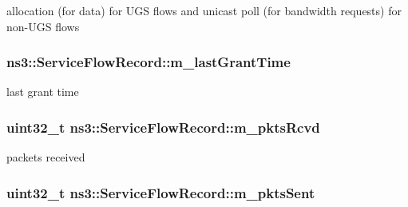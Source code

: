 allocation (for data) for U\+GS flows and unicast poll (for bandwidth requests) for non-\/\+U\+GS flows 

\subsubsection[{\texorpdfstring{m\+\_\+last\+Grant\+Time}{m_lastGrantTime}}]{ ns3\+::\+Service\+Flow\+Record\+::m\+\_\+last\+Grant\+Time\hspace{0.3cm}{\ttfamily [private]}}\hypertarget{classns3_1_1ServiceFlowRecord_a7bb8180a67da3ac452bd11ad634b4d0e}{}\label{classns3_1_1ServiceFlowRecord_a7bb8180a67da3ac452bd11ad634b4d0e}


last grant time 

\subsubsection[{\texorpdfstring{m\+\_\+pkts\+Rcvd}{m_pktsRcvd}}]{\setlength{\rightskip}{0pt plus 5cm}uint32\+\_\+t ns3\+::\+Service\+Flow\+Record\+::m\+\_\+pkts\+Rcvd\hspace{0.3cm}{\ttfamily [private]}}\hypertarget{classns3_1_1ServiceFlowRecord_a4e7b57f4204b86b1a2909c6e4e36806e}{}\label{classns3_1_1ServiceFlowRecord_a4e7b57f4204b86b1a2909c6e4e36806e}


packets received 

\subsubsection[{\texorpdfstring{m\+\_\+pkts\+Sent}{m_pktsSent}}]{\setlength{\rightskip}{0pt plus 5cm}uint32\+\_\+t ns3\+::\+Service\+Flow\+Record\+::m\+\_\+pkts\+Sent\hspace{0.3cm}{\ttfamily [private]}}\hypertarget{classns3_1_1ServiceFlowRecord_a86e6eff06ec00a33783383e5d1543e93}{}\label{classns3_1_1ServiceFlowRecord_a86e6eff06ec00a33783383e5d1543e93}


